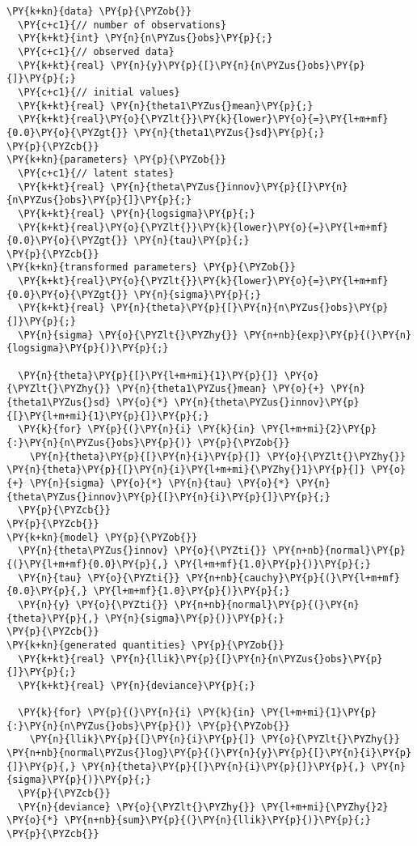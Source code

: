 \begin{Verbatim}[commandchars=\\\{\}]
\PY{k+kn}{data} \PY{p}{\PYZob{}}
  \PY{c+c1}{// number of observations}
  \PY{k+kt}{int} \PY{n}{n\PYZus{}obs}\PY{p}{;}
  \PY{c+c1}{// observed data}
  \PY{k+kt}{real} \PY{n}{y}\PY{p}{[}\PY{n}{n\PYZus{}obs}\PY{p}{]}\PY{p}{;}
  \PY{c+c1}{// initial values}
  \PY{k+kt}{real} \PY{n}{theta1\PYZus{}mean}\PY{p}{;}
  \PY{k+kt}{real}\PY{o}{\PYZlt{}}\PY{k}{lower}\PY{o}{=}\PY{l+m+mf}{0.0}\PY{o}{\PYZgt{}} \PY{n}{theta1\PYZus{}sd}\PY{p}{;}
\PY{p}{\PYZcb{}}
\PY{k+kn}{parameters} \PY{p}{\PYZob{}}
  \PY{c+c1}{// latent states}
  \PY{k+kt}{real} \PY{n}{theta\PYZus{}innov}\PY{p}{[}\PY{n}{n\PYZus{}obs}\PY{p}{]}\PY{p}{;}
  \PY{k+kt}{real} \PY{n}{logsigma}\PY{p}{;}
  \PY{k+kt}{real}\PY{o}{\PYZlt{}}\PY{k}{lower}\PY{o}{=}\PY{l+m+mf}{0.0}\PY{o}{\PYZgt{}} \PY{n}{tau}\PY{p}{;}
\PY{p}{\PYZcb{}}
\PY{k+kn}{transformed parameters} \PY{p}{\PYZob{}}
  \PY{k+kt}{real}\PY{o}{\PYZlt{}}\PY{k}{lower}\PY{o}{=}\PY{l+m+mf}{0.0}\PY{o}{\PYZgt{}} \PY{n}{sigma}\PY{p}{;}
  \PY{k+kt}{real} \PY{n}{theta}\PY{p}{[}\PY{n}{n\PYZus{}obs}\PY{p}{]}\PY{p}{;}
  \PY{n}{sigma} \PY{o}{\PYZlt{}\PYZhy{}} \PY{n+nb}{exp}\PY{p}{(}\PY{n}{logsigma}\PY{p}{)}\PY{p}{;}

  \PY{n}{theta}\PY{p}{[}\PY{l+m+mi}{1}\PY{p}{]} \PY{o}{\PYZlt{}\PYZhy{}} \PY{n}{theta1\PYZus{}mean} \PY{o}{+} \PY{n}{theta1\PYZus{}sd} \PY{o}{*} \PY{n}{theta\PYZus{}innov}\PY{p}{[}\PY{l+m+mi}{1}\PY{p}{]}\PY{p}{;}
  \PY{k}{for} \PY{p}{(}\PY{n}{i} \PY{k}{in} \PY{l+m+mi}{2}\PY{p}{:}\PY{n}{n\PYZus{}obs}\PY{p}{)} \PY{p}{\PYZob{}}
    \PY{n}{theta}\PY{p}{[}\PY{n}{i}\PY{p}{]} \PY{o}{\PYZlt{}\PYZhy{}} \PY{n}{theta}\PY{p}{[}\PY{n}{i}\PY{l+m+mi}{\PYZhy{}1}\PY{p}{]} \PY{o}{+} \PY{n}{sigma} \PY{o}{*} \PY{n}{tau} \PY{o}{*} \PY{n}{theta\PYZus{}innov}\PY{p}{[}\PY{n}{i}\PY{p}{]}\PY{p}{;}
  \PY{p}{\PYZcb{}}
\PY{p}{\PYZcb{}}
\PY{k+kn}{model} \PY{p}{\PYZob{}}
  \PY{n}{theta\PYZus{}innov} \PY{o}{\PYZti{}} \PY{n+nb}{normal}\PY{p}{(}\PY{l+m+mf}{0.0}\PY{p}{,} \PY{l+m+mf}{1.0}\PY{p}{)}\PY{p}{;}
  \PY{n}{tau} \PY{o}{\PYZti{}} \PY{n+nb}{cauchy}\PY{p}{(}\PY{l+m+mf}{0.0}\PY{p}{,} \PY{l+m+mf}{1.0}\PY{p}{)}\PY{p}{;}
  \PY{n}{y} \PY{o}{\PYZti{}} \PY{n+nb}{normal}\PY{p}{(}\PY{n}{theta}\PY{p}{,} \PY{n}{sigma}\PY{p}{)}\PY{p}{;}
\PY{p}{\PYZcb{}}
\PY{k+kn}{generated quantities} \PY{p}{\PYZob{}}
  \PY{k+kt}{real} \PY{n}{llik}\PY{p}{[}\PY{n}{n\PYZus{}obs}\PY{p}{]}\PY{p}{;}
  \PY{k+kt}{real} \PY{n}{deviance}\PY{p}{;}
  
  \PY{k}{for} \PY{p}{(}\PY{n}{i} \PY{k}{in} \PY{l+m+mi}{1}\PY{p}{:}\PY{n}{n\PYZus{}obs}\PY{p}{)} \PY{p}{\PYZob{}}
    \PY{n}{llik}\PY{p}{[}\PY{n}{i}\PY{p}{]} \PY{o}{\PYZlt{}\PYZhy{}} \PY{n+nb}{normal\PYZus{}log}\PY{p}{(}\PY{n}{y}\PY{p}{[}\PY{n}{i}\PY{p}{]}\PY{p}{,} \PY{n}{theta}\PY{p}{[}\PY{n}{i}\PY{p}{]}\PY{p}{,} \PY{n}{sigma}\PY{p}{)}\PY{p}{;}
  \PY{p}{\PYZcb{}}
  \PY{n}{deviance} \PY{o}{\PYZlt{}\PYZhy{}} \PY{l+m+mi}{\PYZhy{}2} \PY{o}{*} \PY{n+nb}{sum}\PY{p}{(}\PY{n}{llik}\PY{p}{)}\PY{p}{;}
\PY{p}{\PYZcb{}}
\end{Verbatim}
